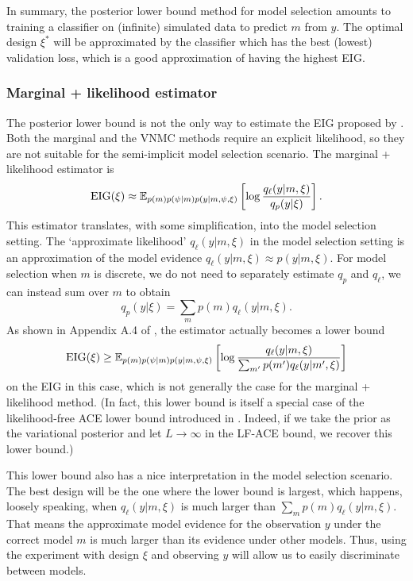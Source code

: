 \documentclass[a4paper, 10pt]{report}
\theoremstyle{plain}
\begin{document}
	In summary, the posterior lower bound method for model selection amounts to training a classifier on (infinite) simulated data to predict $m$ from $y$. The optimal design $\xi^*$ will be approximated by the classifier which has the best (lowest) validation loss, which is a good approximation of having the highest EIG.
	
	
	\subsubsection{Marginal + likelihood estimator}
	The posterior lower bound is not the only way to estimate the EIG proposed by \citet{foster2019variational}.
	Both the marginal and the VNMC methods require an explicit likelihood, so they are not suitable for the semi-implicit model selection scenario.
	The marginal + likelihood estimator is
	\begin{equation}
	\text{EIG}(\xi) \approx \mathbb{E}_{p(m)p(\psi|m)p(y|m,\psi,\xi)}\left[ \log \frac{q_\ell(y|m,\xi)}{q_p(y|\xi)} \right].
	\end{equation}
	This estimator translates, with some simplification, into the model selection setting. 
	The `approximate likelihood' $q_\ell(y|m,\xi)$ in the model selection setting is an approximation of the model evidence $q_\ell(y|m,\xi) \approx p(y|m,\xi)$.
	For model selection when $m$ is discrete, we do not need to separately estimate $q_p$ and $q_\ell$, we can instead sum over $m$ to obtain
	\begin{equation}
	q_p(y|\xi) = \sum_m p(m) q_\ell(y|m,\xi).
	\end{equation}
	As shown in Appendix A.4 of \citet{foster2019variational}, the estimator actually becomes a lower bound 
	\begin{equation}
	\label{eq:model_selection_bound}
	\text{EIG}(\xi) \ge \mathbb{E}_{p(m)p(\psi|m)p(y|m,\psi,\xi)}\left[ \log \frac{q_\ell(y|m,\xi)}{\sum_{m'} p(m') q_\ell(y|m'	,\xi)} \right]
	\end{equation}
	on the EIG in this case, which is not generally the case for the marginal + likelihood method.
	(In fact, this lower bound is itself a special case of the likelihood-free ACE lower bound introduced in \citet{foster2020unified}. Indeed, if we take the prior as the variational posterior and let $L\to\infty$ in the LF-ACE bound, we recover this lower bound.)
	
	This lower bound also has a nice interpretation in the model selection scenario. The best design will be the one where the lower bound is largest, which happens, loosely speaking, when $q_\ell(y|m,\xi)$ is much larger than $\sum_m p(m) q_\ell(y|m,\xi)$. That means the approximate model evidence for the observation $y$ under the correct model $m$ is much larger than its evidence under other models. Thus, using the experiment with design $\xi$ and observing $y$ will allow us to easily discriminate between models.
	
\end{document}
